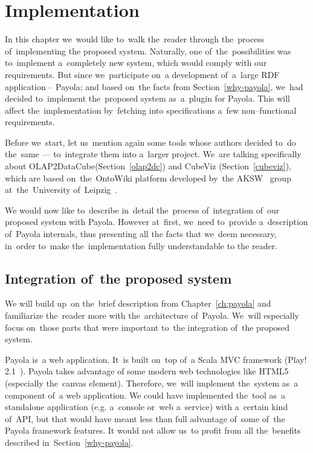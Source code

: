 \chapter{Implementation}
\label{ch:implementation}
In this chapter we~would like to~walk the~reader through the~process of~implementing 
the proposed system. Naturally, one of~the~possibilities was to~implement a~completely new system, 
which would comply with our requirements. But since we~participate on~a development of~a~large RDF
application -- Payola; and based on~the facts from
Section~\ref{why-payola}, we~had decided to~implement the~proposed system as~a~plugin
for Payola. This will affect the~implementation by~fetching into specifications a~few non--functional
requirements.

Before we~start, let us~mention again some tools whose authors decided to~do the~same --- to~integrate them into a~larger project. We~are talking specifically about 
OLAP2DataCube(Section~\ref{olap2dc}) and CubeViz (Section~\ref{cubeviz}),
which are based on~the~OntoWiki platform developed by~the AKSW~\cite{aksw} group at~the~University of~Leipzig~\cite{leipzich-uni}.

We would now like to~describe in~detail the~process of~integration of~our proposed system with
Payola. However at~first, we~need to~provide a~description of~Payola internals, thus presenting all
the facts that we~deem necessary, in~order to~make the~implementation fully understandable to
the reader.

\section{Integration of~the proposed system}
We will build up~on the~brief description from Chapter~\ref{ch:payola} and familiarize the~reader
more with the~architecture of~Payola. We~will especially
focus on~those parts that were important to~the integration of~the proposed system.

Payola is~a web application. It~is built on~top of~a Scala MVC framework (Play! 2.1~\cite{playfw}).
Payola takes advantage of
some modern web technologies like HTML5 (especially the~canvas element).
Therefore, we~will implement the~system as~a component of~a web application.
We could have implemented the~tool as~a standalone 
application (e.g. a~console or~web a~service) with a~certain kind of~API,
but that would have meant less than full advantage of~some of~the Payola framework features.
It would not allow us~to profit from all the~benefits described in~Section~\ref{why-payola}. 

